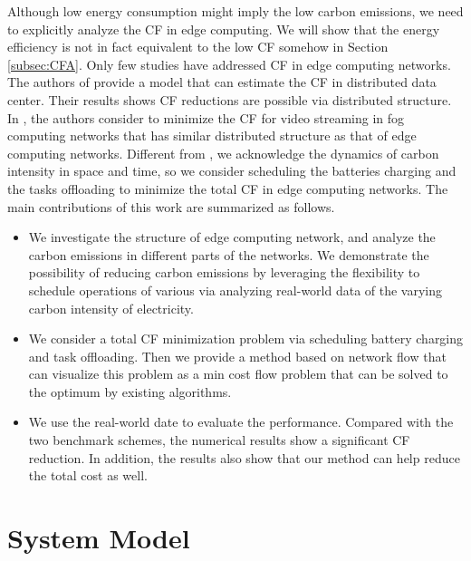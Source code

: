 \documentclass[conference, 10pt, ﬁnal, letterpaper, twocolumn]{IEEEtran}
\begin{document}
Although low energy consumption might imply the low carbon emissions, we need to explicitly analyze the CF in edge computing. We will show that the energy efficiency is not in fact equivalent to the low CF somehow in Section \ref{subsec:CFA}. Only few studies have addressed CF in edge computing networks. The authors of \cite{van2012distributed} provide a model that can estimate the CF in distributed data center. Their results shows CF reductions are possible via distributed structure. In \cite{do2015proximal}, the authors consider to minimize the CF for video streaming in fog computing networks that has similar distributed structure as that of edge computing networks. Different from \cite{do2015proximal}, we acknowledge the dynamics of carbon intensity in space and time, so we consider scheduling the batteries charging and the tasks offloading to minimize the total CF in edge computing networks. The main contributions of this work are summarized as follows.
\begin{itemize}
    \item We investigate the structure of edge computing network, and analyze the carbon emissions in different parts of the networks. We demonstrate the possibility of reducing carbon emissions by leveraging the flexibility to schedule operations of various via analyzing real-world data of the varying carbon intensity of electricity.
    \item We consider a total CF minimization problem via scheduling battery charging and task offloading. Then we provide a method based on network flow that can visualize this problem as a min cost flow problem that can be solved to the optimum by existing algorithms. 
    \item We use the real-world date to evaluate the performance. Compared with the two benchmark schemes, the numerical results show a significant CF reduction. In addition, the results also show that our method can help reduce the total cost as well.
\end{itemize}

\section{System Model}


\end{document}
